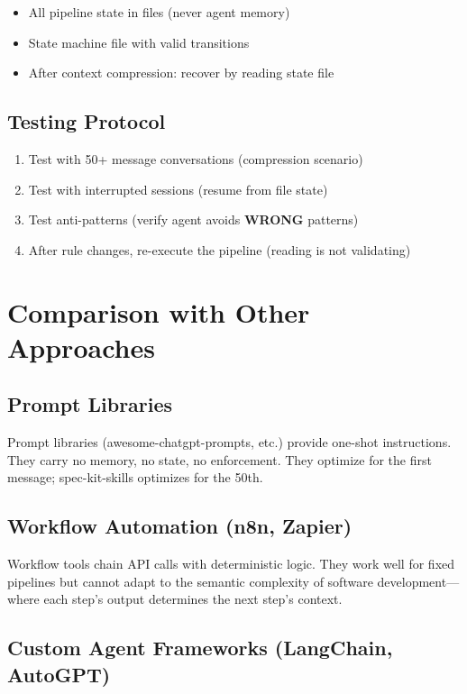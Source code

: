 \documentclass[11pt,a4paper,openright,twoside]{report}
\newcommand{\wrong}{\textcolor{specred}{\textbf{WRONG}}}
\begin{document}
\begin{itemize}
  \item All pipeline state in files (never agent memory)
  \item State machine file with valid transitions
  \item After context compression: recover by reading state file
\end{itemize}

\subsection{Testing Protocol}

\begin{enumerate}
  \item Test with 50+ message conversations (compression scenario)
  \item Test with interrupted sessions (resume from file state)
  \item Test anti-patterns (verify agent avoids \wrong{} patterns)
  \item After rule changes, re-execute the pipeline (reading is not validating)
\end{enumerate}

\section{Comparison with Other Approaches}

\subsection{Prompt Libraries}

Prompt libraries (awesome-chatgpt-prompts, etc.) provide one-shot instructions. They carry no memory, no state, no enforcement. They optimize for the first message; spec-kit-skills optimizes for the 50th.

\subsection{Workflow Automation (n8n, Zapier)}

Workflow tools chain API calls with deterministic logic. They work well for fixed pipelines but cannot adapt to the semantic complexity of software development---where each step's output determines the next step's context.

\subsection{Custom Agent Frameworks (LangChain, AutoGPT)}
\end{document}
